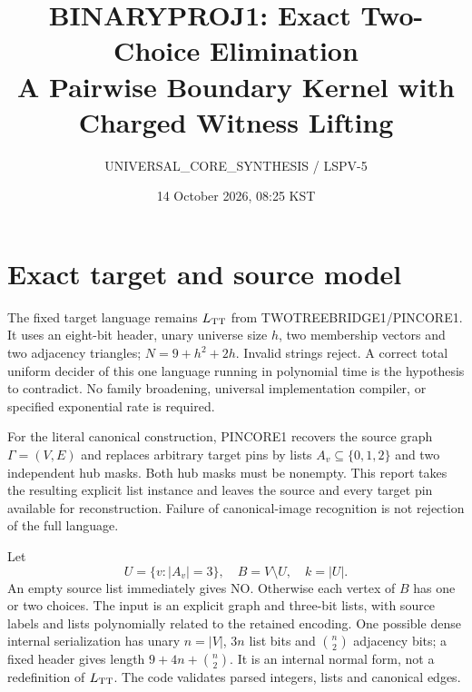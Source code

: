 \documentclass[11pt]{article}
\title{BINARYPROJ1: Exact Two-Choice Elimination\\\large A Pairwise Boundary Kernel with Charged Witness Lifting}
\author{UNIVERSAL\_CORE\_SYNTHESIS / LSPV-5}
\date{14 October 2026, 08:25 KST}
\newcommand{\COL}{\{0,1,2\}}
\begin{document}
\maketitle
\begin{center}
\end{center}

\section{Exact target and source model}
The fixed target language remains $L_{\rm TT}$ from TWOTREEBRIDGE1/PINCORE1.
It uses an eight-bit header, unary universe size $h$, two membership vectors
and two adjacency triangles; $N=9+h^2+2h$. Invalid strings reject.
A correct total uniform decider of this one language running in polynomial
time is the hypothesis to contradict. No family broadening, universal
implementation compiler, or specified exponential rate is required.

For the literal canonical construction, PINCORE1 recovers the source graph
$\Gamma=(V,E)$ and replaces arbitrary target pins by lists
$A_v\subseteq\COL$ and two independent hub masks. Both hub masks must be
nonempty. This report takes the resulting explicit list instance and leaves
the source and every target pin available for reconstruction. Failure of
canonical-image recognition is not rejection of the full language.

Let
\[
 U=\{v:|A_v|=3\},\quad B=V\setminus U,\quad k=|U|.
\]
An empty source list immediately gives NO. Otherwise each vertex of $B$ has
one or two choices. The input is an explicit graph and three-bit lists,
with source labels and lists polynomially related to the retained encoding.
One possible dense internal serialization has unary $n=|V|$, $3n$ list bits
and $\binom n2$ adjacency bits; a fixed header gives length
$9+4n+\binom n2$. It is an internal normal form, not a redefinition of
$L_{\rm TT}$. The code validates parsed integers, lists and canonical edges.
\end{document}
